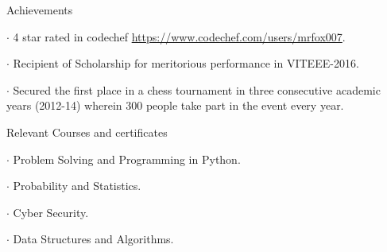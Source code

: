\documentclass{resume} %
\begin{document}

\begin{rSection}{Achievements} \itemsep -5pt
    \item $\cdot$ 4 star rated in codechef \url{https://www.codechef.com/users/mrfox007}.
    \item $\cdot$ Recipient of Scholarship for meritorious performance in VITEEE-2016.
    \item $\cdot$ Secured the first place in a chess tournament in three consecutive academic years (2012-14) wherein \phantom{x}300 people take part in the event every year.
\end{rSection}

\begin{rSection}{Relevant Courses and certificates} \itemsep -4pt \topmargin -50pt
    \item $\cdot$ Problem Solving and Programming in Python.
    \item $\cdot$ Probability and Statistics.
    \item $\cdot$ Cyber Security.
    \item $\cdot$ Data Structures and Algorithms.
\end{rSection}
\end{document}
